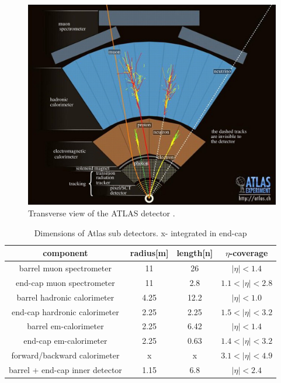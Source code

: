 \documentclass{article}
\begin{document}
\begin{figure}[h]
    \centering
    \includegraphics[scale=0.25]{images/DetectorCrossSection.jpg}
    \caption{ Transverse view of the ATLAS detector \cite{PhysicsRequirementsATLAS}. \label{fig:DetectorCrossSection} }
\end{figure}

\begin{table}[h!t]
\label{table:ATLASSpec}
\centering
\caption{Dimensions of Atlas sub detectors. x- integrated in end-cap }
\begin{tabular}{ |c|c|c|c| } 
\hline
component&radius[m]&length[n]&$\eta$-coverage\\
\hline
 barrel muon spectrometer & 11 & 26 & $|\eta|<1.4$\\
 end-cap muon spectrometer & 11 & 2.8 & $1.1<|\eta|<2.8$\\
 barrel hadronic calorimeter & 4.25 & 12.2 & $|\eta|<1.0$\\
 end-cap hardronic calorimeter & 2.25 & 2.25 & $1.5<|\eta|<3.2$\\
 barrel em-calorimeter & 2.25 & 6.42 & $|\eta|<1.4$\\
 end-cap em-calorimeter & 2.25 & 0.63 & $1.4<|\eta|<3.2$\\
 forward/backward calorimeter & x & x & $3.1<|\eta|<4.9$\\
 barrel + end-cap inner detector & 1.15 & 6.8 & $|\eta|<2.4$\\
 \hline
\end{tabular}
\end{table}
\end{document}
